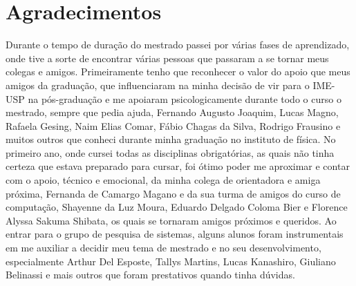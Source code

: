 \documentclass[11pt,twoside,a4paper]{book}
\begin{document}





 \chapter*{Agradecimentos}
 Durante o tempo de duração do mestrado passei por várias fases de aprendizado, onde tive a sorte de encontrar várias pessoas que passaram a se tornar meus colegas e amigos. Primeiramente tenho que reconhecer o valor do apoio que meus amigos da graduação, que influenciaram na minha decisão de vir para o IME-USP na pós-graduação e me apoiaram psicologicamente durante todo o curso o mestrado, sempre que pedia ajuda, Fernando Augusto Joaquim, Lucas Magno, Rafaela Gesing, Naim Elias Comar, Fábio Chagas da Silva, Rodrigo Frausino e muitos outros que conheci durante minha graduação no instituto de física. No primeiro ano, onde cursei todas as disciplinas obrigatórias, as quais não tinha certeza que estava preparado para cursar, foi ótimo poder me aproximar e contar com o apoio, técnico e emocional, da minha colega de orientadora e amiga próxima, Fernanda de Camargo Magano e da sua turma de amigos do curso de computação, Shayenne da Luz Moura, Eduardo Delgado Coloma Bier e Florence Alyssa Sakuma Shibata, os quais se tornaram amigos próximos e queridos. Ao entrar para o grupo de pesquisa de sistemas, alguns alunos foram instrumentais em me auxiliar a decidir meu tema de mestrado e no seu desenvolvimento, especialmente Arthur Del Esposte, Tallys Martins, Lucas Kanashiro, Giuliano Belinassi e mais outros que foram prestativos quando tinha dúvidas. 
 
\end{document}
